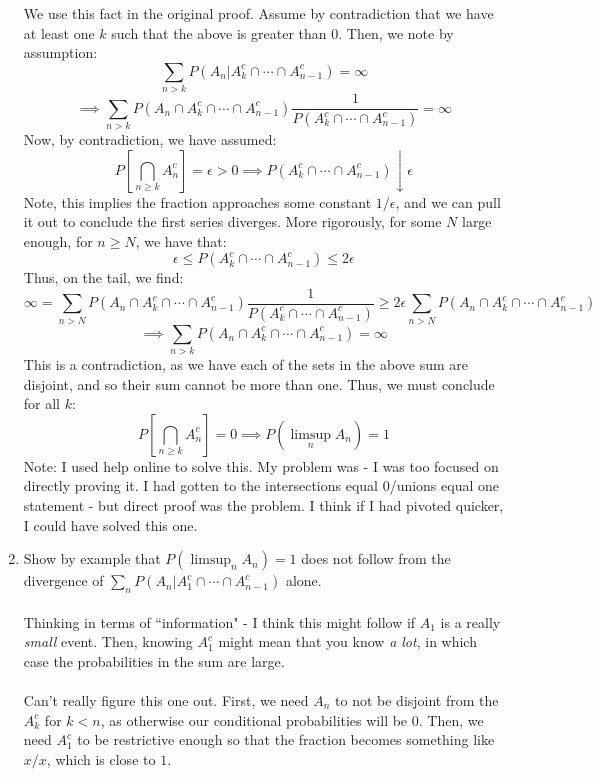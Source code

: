 \documentclass[12pt,a4paper]{article}
\newcommand{\1}[1]{\mathbbm{1}\left\{ #1 \right\}}
\begin{document}
\begin{enumerate}
$$	$$
	We use this fact in the original proof. Assume by contradiction that we have at least one $k$ such that the above is greater than $0$. Then, we note by assumption:
	$$
		\sum_{n > k} P(A_n | A_k^c \cap \cdots \cap A_{n-1}^c) = \infty
	$$
	$$
		\implies
		\sum_{n > k} P(A_n \cap A_k^c \cap \cdots \cap A_{n-1}^c) \frac{1}{P(A_k^c \cap \cdots \cap A_{n-1}^c)} = \infty
	$$
	Now, by contradiction, we have assumed:
	$$
		P\left[\bigcap_{n \geq k} A_n^c\right] = \epsilon > 0 \implies
		P(A_k^c \cap \cdots \cap A_{n-1}^c) \downarrow \epsilon
	$$
	Note, this implies the fraction approaches some constant $1/\epsilon$, and we can pull it out to conclude the first series diverges. More rigorously, for some $N$ large enough, for $n \geq N$, we have that:
	$$
		\epsilon \leq P(A_k^c \cap \cdots \cap A_{n-1}^c) \leq 2\epsilon
	$$
	Thus, on the tail, we find:
	$$
		\infty = \sum_{n > N} P(A_n \cap A_k^c \cap \cdots \cap A_{n-1}^c) \frac{1}{P(A_k^c \cap \cdots \cap A_{n-1}^c)} \geq
		2\epsilon \sum_{n > N} P(A_n \cap A_k^c \cap \cdots \cap A_{n-1}^c)
	$$
	$$
		\implies \sum_{n > k} P(A_n \cap A_k^c \cap \cdots \cap A_{n-1}^c) = \infty
	$$
	This is a contradiction, as we have each of the sets in the above sum are disjoint, and so their sum cannot be more than one. Thus, we must conclude for all $k$:
	$$
		P\left[\bigcap_{n \geq k} A_n^c\right] = 0 \implies
		P(\limsup_n A_n) = 1
	$$
	Note: I used help online to solve this. My problem was - I was too focused on directly proving it. I had gotten to the intersections equal 0/unions equal one statement - but direct proof was the problem. I think if I had pivoted quicker, I could have solved this one.
	
	\item Show by example that $P(\limsup_n A_n) = 1$ does not follow from the divergence of $\sum_n P(A_n | A_1^c \cap \cdots \cap A_{n-1}^c)$ alone.
	\\\\
	Thinking in terms of ``information" - I think this might follow if $A_1$ is a really \textit{small} event. Then, knowing $A_1^c$ might mean that you know \textit{a lot}, in which case the probabilities in the sum are large.
	\\\\
	Can't really figure this one out. First, we need $A_n$ to not be disjoint from the $A_k^c$ for $k < n$, as otherwise our conditional probabilities will be $0$. Then, we need $A_1^c$ to be restrictive enough so that the fraction becomes something like $x/x$, which is close to $1$. 
	

\end{enumerate}
\end{document}
